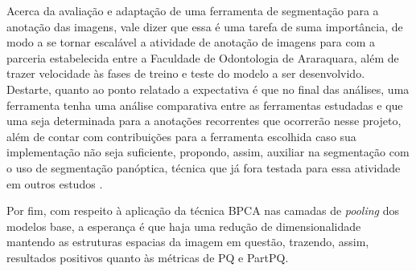 Acerca da avaliação e adaptação de uma ferramenta de segmentação para a anotação das imagens, vale dizer que essa é uma tarefa de suma importância, de modo a se tornar escalável a atividade de anotação de imagens para com a parceria estabelecida entre a Faculdade de Odontologia de Araraquara, além de trazer velocidade às fases de treino e teste do modelo a ser desenvolvido. Destarte, quanto ao ponto relatado a expectativa é que no final das análises, uma ferramenta tenha uma análise comparativa entre as ferramentas estudadas e que uma seja determinada para a anotações recorrentes que ocorrerão nesse projeto, além de contar com contribuições para a ferramenta escolhida caso sua implementação não seja suficiente, propondo, assim, auxiliar na segmentação com o uso de segmentação panóptica, técnica que já fora testada para essa atividade em outros estudos \cite{Elharrouss2021PanopticReview}.

Por fim, com respeito à aplicação da técnica BPCA nas camadas de \textit{pooling} dos modelos base, a esperança é que haja uma redução de dimensionalidade mantendo as estruturas espacias da imagem em questão, trazendo, assim, resultados positivos quanto às métricas de PQ e PartPQ.